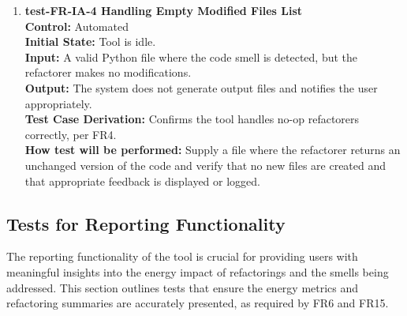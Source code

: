 \documentclass[12pt, titlepage]{article}
\begin{document}
\begin{enumerate}
  \item \textbf{test-FR-IA-4 Handling Empty Modified Files List} \\[2mm]
    \textbf{Control:} Automated \\
    \textbf{Initial State:} Tool is idle. \\
    \textbf{Input:} A valid Python file where the code smell is detected, but the refactorer makes no modifications. \\
    \textbf{Output:} The system does not generate output files and notifies the user appropriately. \\
    \textbf{Test Case Derivation:} Confirms the tool handles no-op refactorers correctly, per FR4. \\
    \textbf{How test will be performed:} Supply a file where the refactorer returns an unchanged version of the code and verify that no new files are created and that appropriate feedback is displayed or logged.
\end{enumerate}

\subsection{Tests for Reporting Functionality}

The reporting functionality of the tool is crucial for providing users with meaningful insights into the energy impact of refactorings and the smells being addressed. This section outlines tests that ensure the energy metrics and refactoring summaries are accurately presented, as required by FR6 and FR15.
\end{document}
